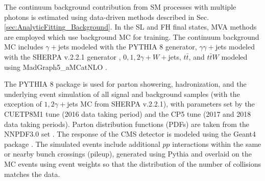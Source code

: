The continuum background contribution from SM processes with multiple photons is estimated using data-driven methods described in Sec. \ref{sec:AnalyticFitting_Background}. In the SL and 
FH final states, MVA methods are employed which use background MC for training.
The continuum background MC includes $\gamma+$jets modeled with the PYTHIA 8 \cite{Sjostrand:2014zea} generator, $\gamma\gamma+$jets modeled with the SHERPA v.2.2.1 generator \cite{Bothmann:2019yzt}, $0,1,2\gamma+W+$jets, $t\bar{t}$, and $t\bar{t}W$ modeled using MadGraph5\_aMCatNLO \cite{Alwall:2014hca,Artoisenet:2012st,Frederix:2012ps}.

The PYTHIA 8 \cite{Sjostrand:2014zea} package is used for parton showering, hadronization, and the underlying event simulation of all signal and background samples (with the exception of $1,2\gamma+$jets MC from SHERPA v.2.2.1),
with parameters set by the CUETP8M1 tune \cite{Khachatryan:2015pea} (2016 data taking period) and the CP5 tune \cite{Sirunyan:2019dfx} (2017 and 2018 data taking periods). Parton distribution functions (PDFs) are taken from the NNPDF3.0 set \cite{Ball:2014uwa}.
The response of the CMS detector is modeled using the Geant4 package \cite{AGOSTINELLI2003250}.
The simulated events include additional $pp$ interactions within the same or nearby bunch crossings (pileup), generated using Pythia and overlaid on the MC events using event weights so that the distribution of the number of collisions matches the data.

